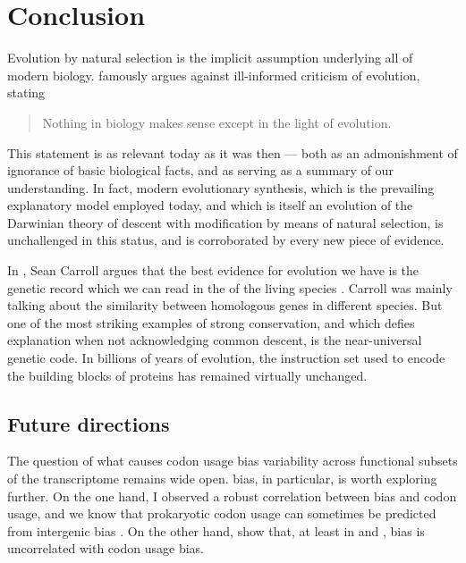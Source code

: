 \chapter{Conclusion}
\label{sec:conclusion}


\noindent
Evolution by natural selection is the implicit assumption underlying all of
modern biology. \citet{Dobzhansky:1973} famously argues against ill-informed
criticism of evolution, stating

\begin{quote}
    Nothing in biology makes sense except in the light of evolution.
\end{quote}

This statement is as relevant today as it was then --- both as an admonishment
of ignorance of basic biological facts, and as serving as a summary of our
understanding. In fact, modern evolutionary synthesis, which is the prevailing
explanatory model employed today, and which is itself an evolution of the
Darwinian theory of descent with modification by means of natural selection, is
unchallenged in this status, and is corroborated by every new piece of evidence.

In , Sean Carroll argues that the best
evidence for evolution we have is the genetic record which we can read in the
\dna of the living species \citep{Carroll:2006}. Carroll was mainly talking
about the similarity between homologous genes in different species. But one of
the most striking examples of strong conservation, and which defies explanation
when not acknowledging common descent, is the near-universal genetic code. In
billions of years of evolution, the instruction set used to encode the building
blocks of proteins has remained virtually unchanged.


\section{Future directions}

The question of what causes codon usage bias variability across functional
subsets of the transcriptome remains wide open. \gc bias, in particular, is
worth exploring further. On the one hand, I observed a robust correlation
between \gc bias and codon usage, and we know that prokaryotic codon usage can
sometimes be predicted from intergenic \gc bias \citep{Chen:2004}. On the other
hand, \citet{Duret:2002} show that, at least in  and
, \gc bias is uncorrelated with codon usage bias.

